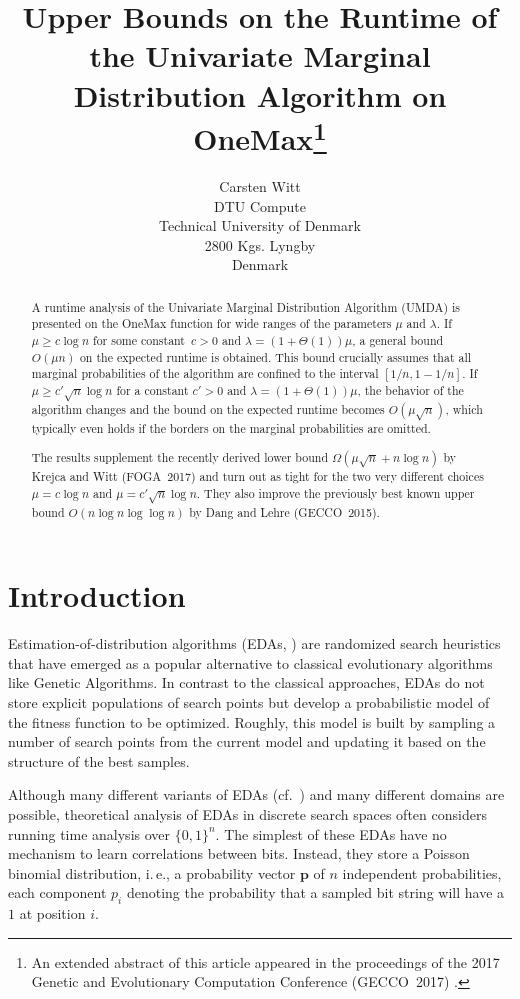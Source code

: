 \documentclass[11pt, a4paper]{article}
\title{Upper Bounds on the Runtime of the Univariate Marginal Distribution Algorithm on OneMax\thanks{An extended abstract 
of this article appeared in the proceedings of the 2017 Genetic and Evolutionary Computation Conference (GECCO~2017) \cite{WittGECCO17}.}}
\author{Carsten Witt\\DTU Compute\\Technical University of Denmark\\
  2800 Kgs. Lyngby\\
	Denmark}
\newcommand{\umda}{UMDA\xspace}
\newcommand{\ie}{i.\,e.\xspace}
\begin{document}
\maketitle

\begin{abstract}
A runtime analysis of the Univariate Marginal Distribution Algorithm (\umda) is presented on the OneMax function for 
				wide ranges of the parameters $\mu$ and $\lambda$. If $\mu\ge c\log n$   
				for some constant~$c>0$ and $\lambda=(1+\Theta(1))\mu$, 
				a general bound $O(\mu n)$ on the expected runtime is obtained.
				This bound crucially assumes that all marginal probabilities of the algorithm are confined to the interval $[1/n,1-1/n]$. 
				If $\mu\ge c' \sqrt{n}\log n$ for a constant $c'>0$ and $\lambda=(1+\Theta(1))\mu$, the behavior 
				of the algorithm changes and the bound on the expected runtime becomes $O(\mu\sqrt{n})$, 
				which typically even holds if the borders on the marginal probabilities are omitted. 				
				
        The results supplement the recently derived lower bound $\Omega(\mu\sqrt{n}+n\log n)$ 
				by Krejca and Witt (FOGA~2017) and turn out as tight for the two very different choices $\mu=c\log n$ 
				and $\mu=c'\sqrt{n}\log n$. 
				They also improve the previously best known upper bound $O(n\log n\log\log n)$ by Dang and Lehre (GECCO~2015).
				\end{abstract}




\section{Introduction}
\begin{sloppypar}
Estimation-of-distribution algorithms (EDAs, \cite{LarranagaLozanoEDABook}) 
are randomized search heuristics that have 
emerged as a popular alternative to classical 
evolutionary algorithms like Genetic Algorithms. In contrast to the classical approaches, 
EDAs do not store explicit populations of search points but develop a probabilistic model 
of the fitness function to be optimized. Roughly, this model is built by sampling 
a number of search points from the current model and updating it based on the structure 
of the best samples.
\end{sloppypar}

Although many different variants of EDAs (cf.~\cite{HauschildPelikan11}) 
and many different domains are possible, theoretical analysis of EDAs in 
discrete search spaces often considers running time analysis over $\{0, 1\}^n$. The simplest 
of these  EDAs have no mechanism to learn correlations between bits. Instead, 
they store a Poisson binomial distribution, \ie, a probability vector $\bm{ p}$ of $n$ independent 
probabilities, each component $p_i$ denoting the probability that a sampled bit string will have a $1$ at position $i$.
\end{document}
